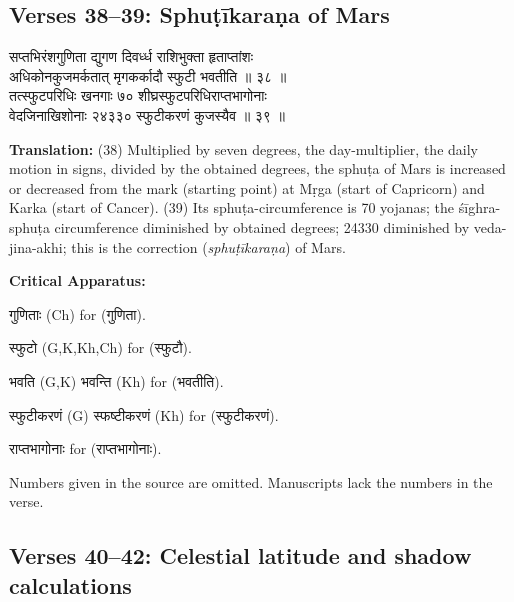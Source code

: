 \documentclass[11pt,a4paper]{article}
\newcommand{\dev}[1]{{\devanagarifont #1}}
\newcommand{\sanskritcol}[1]{%
  \begin{minipage}[t]{0.47\textwidth}
  \vspace{0pt}
  \begin{flushleft}
  #1
  \end{flushleft}
  \end{minipage}%
  \hfill
}
\newcommand{\englishcol}[1]{%
  \begin{minipage}[t]{0.47\textwidth}
  \vspace{0pt}
  \begin{flushleft}
  #1
  \end{flushleft}
  \end{minipage}%
}
\newenvironment{variants}{%
  \small%
  \color{varecolor}%
  \list{}{\leftmargin=2em\itemindent=-1em}%
}{\endlist}
\begin{document}
\subsection*{Verses 38--39: Sphuṭīkaraṇa of Mars}

\noindent
\sanskritcol{\dev{सप्तभिरंशगुणिता द्युगण दिवर्ध्ध राशिभुक्ता हृताप्तांशः} \\ \dev{अधिकोनकुजमर्कतात् मृगकर्कादौ स्फुटी भवतीति ॥ ३८ ॥} \\[0.2cm]
\dev{तत्स्फुटपरिधिः खनगाः ७० शीघ्रस्फुटपरिधिराप्तभागोनाः} \\ \dev{वेदजिनाखिशोनाः २४३३० स्फुटीकरणं कुजस्यैव ॥ ३९ ॥}}
\englishcol{\textbf{Translation:} (38) Multiplied by seven degrees, the day-multiplier, the daily
motion in signs, divided by the obtained degrees, the sphuṭa of Mars is increased
or decreased from the mark (starting point) at Mṛga (start of Capricorn) and Karka
(start of Cancer). (39) Its sphuṭa-circumference is 70 yojanas; the śīghra-sphuṭa
circumference diminished by obtained degrees; 24330 diminished by veda-jina-akhi;
this is the correction (\textit{sphuṭīkaraṇa}) of Mars.}

\vspace{0.4cm}
\textcolor{varecolor}{\textbf{Critical Apparatus:}}
\begin{variants}
\item[38.1] \dev{गुणिताः} (Ch) \dev{for} (\dev{गुणिता}).
\item[38.2] \dev{स्फुटो} (G,K,Kh,Ch) \dev{for} (\dev{स्फुटौ}).
\item[38.3] \dev{भवति} (G,K) \dev{भवन्ति} (Kh) \dev{for} (\dev{भवतीति}).
\item[39.1] \dev{स्फुटीकरणं} (G) \dev{स्फष्टीकरणं} (Kh) \dev{for} (\dev{स्फुटीकरणं}).
\item[39.2] \dev{राप्तभागोनाः} \dev{for} (\dev{राप्तभागोनाः}).
\item[\dev{वि०}] Numbers given in the source are omitted. Manuscripts lack the numbers in the verse.
\end{variants}

\subsection*{Verses 40--42: Celestial latitude and shadow calculations}
\end{document}
